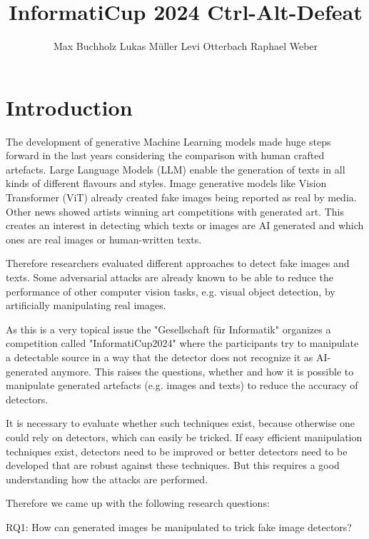 \documentclass{article} %
\title{InformatiCup 2024 Ctrl-Alt-Defeat}
\author{Max Buchholz \And Lukas Müller \And Levi Otterbach \And Raphael Weber}
\begin{document}
\maketitle

\begin{abstract}

\end{abstract}

\section{Introduction}
The development of generative Machine Learning models made huge steps forward in the last years considering the comparison with human crafted artefacts. Large Language Models (LLM) enable the generation of texts in all kinds of different flavours and styles. Image generative models like Vision Transformer (ViT) already created fake images being reported as real by media. Other news showed artists winning art competitions with generated art. This creates an interest in detecting which texts or images are AI generated and which ones are real images or human-written texts.

Therefore researchers evaluated different approaches to detect fake images and texts. Some adversarial attacks are already known to be able to reduce the performance of other computer vision tasks, e.g. visual object detection, by artificially manipulating real images.

As this is a very topical issue the "Gesellschaft für Informatik" \cite{GI} organizes a competition called "InformatiCup2024" \cite{InformatiCup} where the participants try to manipulate a detectable source in a way that the detector does not recognize it as AI-generated anymore. This raises the questions, whether and how it is possible to manipulate generated artefacts (e.g. images and texts) to reduce the accuracy of detectors.

It is necessary to evaluate whether such techniques exist, because otherwise one could rely on detectors, which can easily be tricked. If easy efficient manipulation techniques exist, detectors need to be improved or better detectors need to be developed that are robust against these techniques. But this requires a good understanding how the attacks are performed.

Therefore we came up with the following research questions:


RQ1: How can generated images be manipulated to trick fake image detectors?
\end{document}
